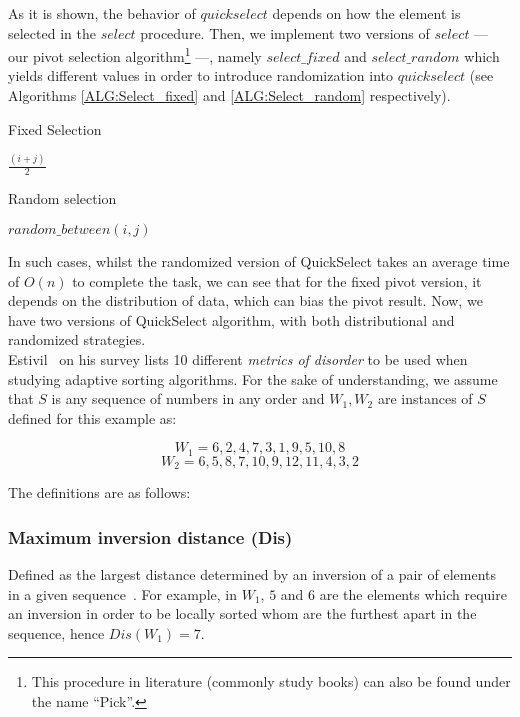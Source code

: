 As it is shown, the behavior of $quickselect$ depends on how the element is selected in the $select$ procedure. Then, we implement two versions of $select$ --- our pivot selection algorithm\footnote{This procedure in literature (commonly study books) can also be found under the name ``Pick''.} ---, namely $select\_fixed$ and $select\_random$ which yields different values in order to introduce randomization into $quickselect$ (see Algorithms \ref{ALG:Select_fixed} and \ref{ALG:Select_random} respectively).\\

\begin{algorithm}
  \caption{Fixed Selection}\label{ALG:Select_fixed}
  \begin{algorithmic}[1]
    \State \Return $\frac{(i+j)}{2}$
    \EndProcedure
  \end{algorithmic}
\end{algorithm}

\begin{algorithm}
  \caption{Random selection}\label{ALG:Select_random}
  \begin{algorithmic}[1]
    \State \Return $random\_between(i,j)$
    \EndProcedure
  \end{algorithmic}
\end{algorithm}

In such cases, whilst the randomized version of QuickSelect takes an average time of $O(n)$ to complete the task, we can see that for the fixed pivot version, it depends on the distribution of data, which can bias the pivot result. Now, we have two versions of QuickSelect algorithm, with both distributional and randomized strategies.\\

Estivil~\cite{estivil92} on his survey lists 10 different \textit{metrics of disorder} to be used when studying adaptive sorting algorithms. For the sake of understanding, we assume that $S$ is any sequence of numbers in any order and $W_1,W_2$ are instances of $S$ defined for this example as: 

$$W_1 = {6,2,4,7,3,1,9,5,10,8}$$
$$W_2 = {6,5,8,7,10,9,12,11,4,3,2}$$

The definitions are as follows:

\subsubsection{Maximum inversion distance (Dis)}
Defined as the largest distance determined by an inversion of a pair of elements in a given sequence~\cite{Estivill-Castro_Wood_1989}.  For example, in $W_1$,  $5$ and $6$ are the elements which require an inversion in order to be locally sorted whom are the furthest apart in the sequence, hence $Dis(W_1) = 7$.\\

